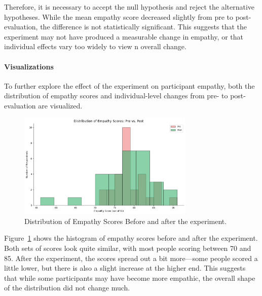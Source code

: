 \vspace{1em}

Therefore, it is necessary to accept the null hypothesis and reject the alternative hypotheses. While the mean empathy score decreased slightly from pre to post-evaluation, the difference is not statistically significant. This suggests that the experiment may not have produced a measurable change in empathy, or that individual effects vary too widely to view n overall change.

\paragraph{Visualizations}

To further explore the effect of the experiment on participant empathy, both the distribution of empathy scores and individual-level changes from pre- to post-evaluation are visualized. 

\begin{figure}[htbp]
    \centering
    \includegraphics[width=0.75\textwidth]{../../Figures/emp-comparison.png}
    \caption{Distribution of Empathy Scores Before and after the experiment.}
    \label{fig:empathy_dist_hist}
\end{figure}

Figure~\ref{fig:empathy_dist_hist} shows the histogram of empathy scores before and after the experiment. Both sets of scores look quite similar, with most people scoring between 70 and 85. After the experiment, the scores spread out a bit more—some people scored a little lower, but there is also a slight increase at the higher end. This suggests that while some participants may have become more empathic, the overall shape of the distribution did not change much.

